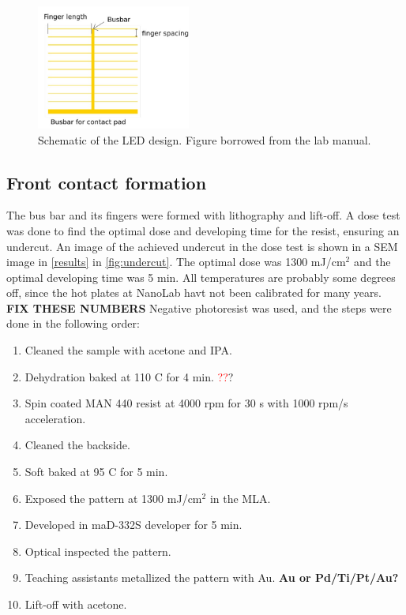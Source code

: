 \begin{figure}[ht]
    \centering
    \includegraphics[width=0.45\textwidth]{figures/LED_schematic.jpg}
    \caption{
        Schematic of the LED design.
        Figure borrowed from the lab manual.
    }
    \label{fig:led_schematic}
\end{figure}


\subsection{Front contact formation}
\label{methods:front_contact}

The bus bar and its fingers were formed with lithography and lift-off.
A dose test was done to find the optimal dose and developing time for the resist, ensuring an undercut.
An image of the achieved undercut in the dose test is shown in a SEM image in \autoref{results} in \autoref{fig:undercut}.
The optimal dose was 1300 mJ/cm$^2$ and the optimal developing time was 5 min.
All temperatures are probably some degrees off, since the hot plates at NanoLab havt not been calibrated for many years.
\textbf{FIX THESE NUMBERS}
Negative photoresist was used, and the steps were done in the following order:
\begin{enumerate}
    \item Cleaned the sample with acetone and IPA.
    \item Dehydration baked at 110 \textdegree C for 4 min. \textcolor{red}{??}?
    \item Spin coated MAN 440 resist at 4000 rpm for 30 s with 1000 rpm/s acceleration.
    \item Cleaned the backside.
    \item Soft baked at 95 \textdegree C for 5 min.
    \item Exposed the pattern at 1300 mJ/cm$^2$ in the MLA.
    \item Developed in maD-332S developer for 5 min.
    \item Optical inspected the pattern.
    \item Teaching assistants metallized the pattern with Au. \textbf{Au or Pd/Ti/Pt/Au?}
    \item Lift-off with acetone.
\end{enumerate}

